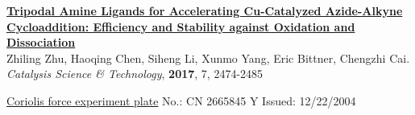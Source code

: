\documentclass[12pt,letterpaper]{article}
\newcommand{\mhead}[1]{\leavevmode\marginpar{\sffamily\footnotesize #1}}
\begin{document}
\href{http://pubs.rsc.org/-/content/articlelanding/2017/cy/c7cy00587c/unauth#!divAbstract}{\textbf{Tripodal Amine Ligands for Accelerating Cu-Catalyzed Azide-Alkyne Cycloaddition: Efficiency and Stability against Oxidation and Dissociation}}\\
Zhiling Zhu, Haoqing Chen, Siheng Li, Xunmo Yang, Eric Bittner, Chengzhi Cai. \emph{Catalysis Science \& Technology}, \textbf{2017}, 7, 2474-2485  

\bigskip
\mhead{Patent}%
\href{https://www.google.com/patents/CN2665845Y?cl=en}{Coriolis force experiment plate} \quad\quad\quad\quad No.: CN 2665845 Y  \quad\quad\quad\quad Issued: 12/22/2004
\end{document}
